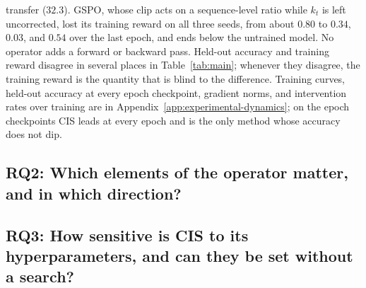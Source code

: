 transfer ($32.3$). GSPO, whose clip acts on a sequence-level ratio while $k_t$ is left uncorrected, lost its training reward on all three seeds, from about $0.80$ to $0.34$, $0.03$, and $0.54$ over the last epoch, and ends below the untrained model. No operator adds a forward or backward pass. Held-out accuracy and training reward disagree in several places in Table~\ref{tab:main}; whenever they disagree, the training reward is the quantity that is blind to the difference. Training curves, held-out accuracy at every epoch checkpoint, gradient norms, and intervention rates over training are in Appendix~\ref{app:experimental-dynamics}; on the epoch checkpoints CIS leads at every epoch and is the only method whose accuracy does not dip.

\subsection{RQ2: Which elements of the operator matter, and in which direction?}
\label{sec:experiments-ablation}


\subsection{RQ3: How sensitive is CIS to its hyperparameters, and can they be set without a search?}
\label{sec:experiments-tuning}

